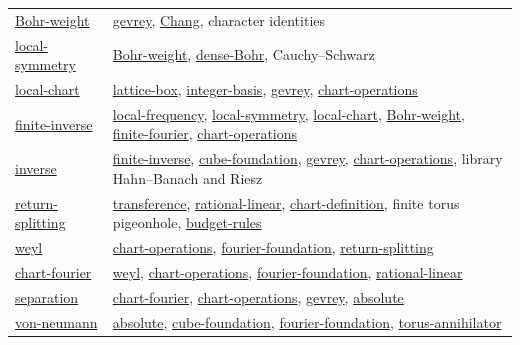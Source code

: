 \documentclass[11pt]{article}
\theoremstyle{definition}
\numberwithin{equation}{section}
\begin{document}
\begin{longtable}{@{}p{}p{}@{}}
\hyperlink{bp:Bohr-weight}{Bohr-weight} & \hyperlink{bp:gevrey}{gevrey}, \hyperlink{bp:Chang}{Chang}, character identities\\[3pt]
\hyperlink{bp:local-symmetry}{local-symmetry} & \hyperlink{bp:Bohr-weight}{Bohr-weight}, \hyperlink{bp:dense-Bohr}{dense-Bohr}, Cauchy--Schwarz\\[3pt]
\hyperlink{bp:local-chart}{local-chart} & \hyperlink{bp:lattice-box}{lattice-box}, \hyperlink{bp:integer-basis}{integer-basis}, \hyperlink{bp:gevrey}{gevrey}, \hyperlink{bp:chart-operations}{chart-operations}\\[3pt]
\hyperlink{bp:finite-inverse}{finite-inverse} & \hyperlink{bp:local-frequency}{local-frequency}, \hyperlink{bp:local-symmetry}{local-symmetry}, \hyperlink{bp:local-chart}{local-chart}, \hyperlink{bp:Bohr-weight}{Bohr-weight}, \hyperlink{bp:finite-fourier}{finite-fourier}, \hyperlink{bp:chart-operations}{chart-operations}\\[3pt]
\hyperlink{bp:inverse}{inverse} & \hyperlink{bp:finite-inverse}{finite-inverse}, \hyperlink{bp:cube-foundation}{cube-foundation}, \hyperlink{bp:gevrey}{gevrey}, \hyperlink{bp:chart-operations}{chart-operations}, library Hahn--Banach and Riesz\\[3pt]
\hyperlink{bp:return-splitting}{return-splitting} & \hyperlink{bp:transference}{transference}, \hyperlink{bp:rational-linear}{rational-linear}, \hyperlink{bp:chart-definition}{chart-definition}, finite torus pigeonhole, \hyperlink{bp:budget-rules}{budget-rules}\\[3pt]
\hyperlink{bp:weyl}{weyl} & \hyperlink{bp:chart-operations}{chart-operations}, \hyperlink{bp:fourier-foundation}{fourier-foundation}, \hyperlink{bp:return-splitting}{return-splitting}\\[3pt]
\hyperlink{bp:chart-fourier}{chart-fourier} & \hyperlink{bp:weyl}{weyl}, \hyperlink{bp:chart-operations}{chart-operations}, \hyperlink{bp:fourier-foundation}{fourier-foundation}, \hyperlink{bp:rational-linear}{rational-linear}\\[3pt]
\hyperlink{bp:separation}{separation} & \hyperlink{bp:chart-fourier}{chart-fourier}, \hyperlink{bp:chart-operations}{chart-operations}, \hyperlink{bp:gevrey}{gevrey}, \hyperlink{bp:absolute}{absolute}\\[3pt]
\hyperlink{bp:von-neumann}{von-neumann} & \hyperlink{bp:absolute}{absolute}, \hyperlink{bp:cube-foundation}{cube-foundation}, \hyperlink{bp:fourier-foundation}{fourier-foundation}, \hyperlink{bp:torus-annihilator}{torus-annihilator}\\[3pt]

\end{longtable}
\end{document}
